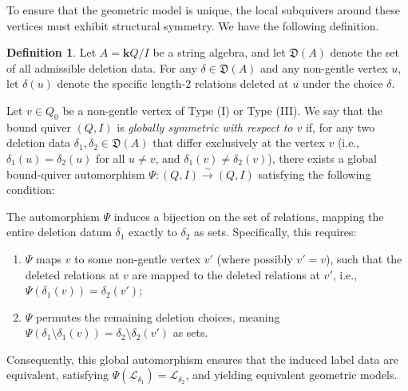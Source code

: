 \documentclass[11pt]{amsart}
\numberwithin{equation}{section}
\theoremstyle{definition}
\newtheorem{definition}[theorem]{Definition}
\begin{document}
To ensure that the geometric model is unique, the local subquivers around these vertices must exhibit structural symmetry. We have the following definition.


\begin{definition}\label{def:symmetric_vertex}
Let $A = \mathbf{k}Q/I$ be a string algebra, and let $\mathfrak{D}(A)$ denote the set of all admissible deletion data. For any $\delta \in \mathfrak{D}(A)$ and any non-gentle vertex $u$, let $\delta(u)$ denote the specific length-$2$ relations deleted at $u$ under the choice $\delta$.

Let $v \in Q_0$ be a non-gentle vertex of Type (I) or Type (III). We say that the bound quiver $(Q, I)$ is \emph{globally symmetric with respect to $v$} if, for any two deletion data $\delta_1, \delta_2 \in \mathfrak{D}(A)$ that differ exclusively at the vertex $v$ (i.e., $\delta_1(u) = \delta_2(u)$ for all $u \neq v$, and $\delta_1(v) \neq \delta_2(v)$), there exists a global bound-quiver automorphism $\Psi: (Q, I) \xrightarrow{\sim} (Q, I)$ satisfying the following condition:

The automorphism $\Psi$ induces a bijection on the set of relations, mapping the entire deletion datum $\delta_1$ exactly to $\delta_2$ as sets. Specifically, this requires:
\begin{enumerate}
    \item[$(\mathrm{i})$] $\Psi$ maps $v$ to some non-gentle vertex $v'$ (where possibly $v' = v$), such that the deleted relations at $v$ are mapped to the deleted relations at $v'$, i.e., $\Psi(\delta_1(v)) = \delta_2(v')$;
    \item[$(\mathrm{ii})$] $\Psi$ permutes the remaining deletion choices, meaning $\Psi(\delta_1 \setminus \delta_1(v)) = \delta_2 \setminus \delta_2(v')$ as sets.
\end{enumerate}
Consequently, this global automorphism ensures that the induced label data are equivalent, satisfying $\Psi(\mathcal{L}_{\delta_1}) = \mathcal{L}_{\delta_2}$, and yielding equivalent geometric models.
\end{definition}
\end{document}
